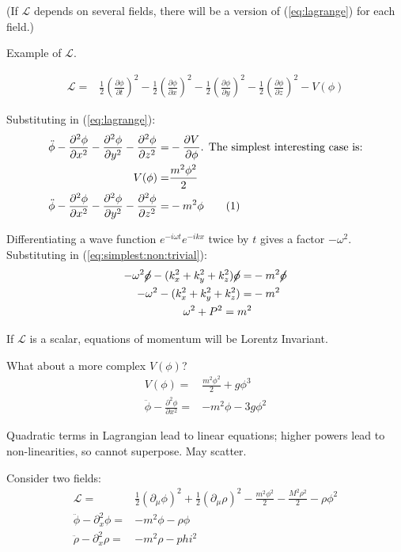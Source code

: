 \documentclass[]{article}
\newcommand\numberthis{\addtocounter{equation}{1}\tag{\theequation}}
\begin{document}
(If $\mathcal{L}$ depends on several fields, there will be a version of (\ref{eq:lagrange})  for each field.)

Example of $\mathcal{L}$.

\begin{align*}
	\mathcal{L} =& \frac{1}{2} (\frac{\partial \phi}{\partial t})^2 - \frac{1}{2} (\frac{\partial \phi}{\partial x})^2 - \frac{1}{2} (\frac{\partial \phi}{\partial y})^2 - \frac{1}{2} (\frac{\partial \phi}{\partial z})^2 - V(\phi)
\end{align*}

Substituting in (\ref{eq:lagrange}):
\begin{align*}
	\ddot{\phi} - \frac{\partial^2 \phi}{\partial x^2}  - \frac{\partial^2 \phi}{\partial y^2}  - \frac{\partial^2 \phi}{\partial z^2} =& - \frac{\partial V}{\partial \phi} \text{. The simplest interesting case is:}\\
	V(\phi) =& \frac{m^2 \phi^2}{2}\\
	\ddot{\phi} - \frac{\partial^2 \phi}{\partial x^2}  - \frac{\partial^2 \phi}{\partial y^2}  - \frac{\partial^2 \phi}{\partial z^2} =& - m^2 \phi \numberthis \label{eq:simplest:non:trivial}
\end{align*}

Differentiating a wave function $e^{-i \omega t} e^{-i k x}$ twice by $t$ gives a factor $-\omega^2$. Substituting in (\ref{eq:simplest:non:trivial}):
\begin{align*}
-\omega^2 \cancel{\phi} - (k_x^2+k_y^2+k_z^2)\cancel{\phi} =& -m^2 \cancel{\phi}\\
-\omega^2  - (k_x^2+k_y^2+k_z^2) =& -m^2 \\
\omega^2 + P^2 = m^2
\end{align*}

If $\mathcal{L}$ is a scalar, equations of momentum will be Lorentz Invariant.

What about a more complex $V(\phi)$?
\begin{align*}
	V(\phi) =& \frac{m^2 \phi^2}{2} + g \phi^3\\
	\ddot{\phi} - \frac{\partial^2 \phi}{\partial x^2}  =& - m^2 \phi - 3 g \phi^2
\end{align*}

Quadratic terms in Lagrangian lead to linear equations; higher powers lead to non-linearities, so cannot superpose. May scatter.

Consider two fields:
\begin{align*}
	\mathcal{L} =& \frac{1}{2}(\partial_{\mu} \phi)^2 + \frac{1}{2}(\partial_{\mu} \rho)^2 - \frac{m^2 \phi^2}{2} - \frac{M^2 \rho^2}{2} - \rho \phi^2\\
	\ddot{\phi} - \partial_x^2 \phi =& -m^2 \phi - \rho \phi
	\\
	\ddot{\rho} - \partial_x^2 \rho =& -m^2 \rho -phi^2
\end{align*}
\end{document}
